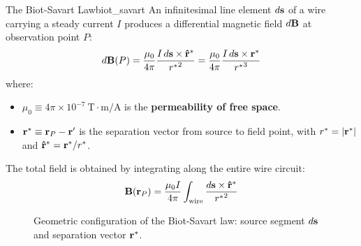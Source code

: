 \begin{definition}{The Biot-Savart Law}{biot_savart}
An infinitesimal line element $d\vb{s}$ of a wire carrying a steady current $I$ produces a differential magnetic field $d\vb{B}$ at observation point $P$:
\begin{equation}
    d\vb{B}(P) = \frac{\mu_0}{4\pi} \frac{I\,d\vb{s} \times \vu{r}^*}{{r^*}^2} = \frac{\mu_0}{4\pi} \frac{I\,d\vb{s} \times \vb{r}^*}{{r^*}^3}
    \label{eq:biot_savart_line}
\end{equation}
where:
\begin{itemize}
    \item $\mu_0 \equiv 4\pi \times 10^{-7}\ \mathrm{T\cdot m / A}$ is the \textbf{permeability of free space}.
    \item $\vb{r}^* \equiv \vb{r}_P - \vb{r}'$ is the separation vector from source to field point, with $r^* = \abs{\vb{r}^*}$ and $\vu{r}^* = \vb{r}^*/r^*$.
\end{itemize}
The total field is obtained by integrating along the entire wire circuit:
\begin{equation}
    \vb{B}(\vb{r}_P) = \frac{\mu_0 I}{4\pi} \int_{\mathrm{wire}} \frac{d\vb{s} \times \vu{r}^*}{{r^*}^2}
\end{equation}
\end{definition}

\begin{figure}[htbp]
    \centering
    \caption{Geometric configuration of the Biot-Savart law: source segment $d\vb{s}$ and separation vector $\vb{r}^*$.}
    \label{fig:biot_savart_geom}
\end{figure}

